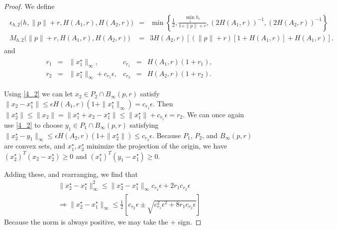\documentclass{article}
\theoremstyle{case}
\numberwithin{theorem}{subsection}
\newcommand{\bpr}{{B_{\infty}\left(p, r\right)}}
\begin{document}
\begin{proof}
We define
\begin{align*}
\begin{array}{rcl}
\epsilon_{h, 2}\big(h, \|p\| + r, H\left(A_1, r\right), H\left(A_2, r\right)\big) & = &
\min\left\{\frac 1 2, \frac{\min_i h_i}{1 + \|p\| + r},\left(2 H\left(A_1, r\right)\right)^{-1}, \left(2 H\left(A_2, r\right)\right)^{-1}\right\}\\
M_{h, 2} \big(\|p\| + r, H\left(A_1, r\right), H\left(A_2, r\right) \big) & = & 3H\left(A_2, r\right) \left[\left(\|p\| + r\right)\left[1 + H(A_1, r)\right] + H(A_1, r)\right].
\end{array}
\end{align*}
and
\begin{align*}
\begin{array}{rclrcl}
r_1 &=& \|x_1^{\star}\|_{\infty},
& c_{r_1} &=& H\left(A_1, r\right)\left(1 + r_1\right), \\
r_2 &=&  \|x_1^{\star}\|_{\infty} + c_{r_1}\epsilon,
& c_{r_2} &=&  H\left(A_2, r\right)\left(1 + r_2\right).
\end{array}
\end{align*}

Using \cref{4_2} we can let $x_2 \in P_2 \cap \bpr$ satisfy 
$\|x_2 - x_1^{\star}\| \le \epsilon H(A_1, r) \left(1 + \|x_1^{\star}\|_{\infty}\right) = c_{r_1}\epsilon$.
Then
$\|x_2^{\star}\| \le \|x_2\| = \|x_1^{\star} + x_2 - x_1^{\star}\| \le \|x_1^{\star}\| + c_{r_1}\epsilon = r_2$.
We can once again use \cref{4_2} to choose $y_1 \in P_1 \cap \bpr$ satisfying 
$\|x_2^{\star} - y_1\|_{\infty} \le \epsilon H(A_2, r)\left(1 + \|x_2^{\star}\|\right) \le c_{r_2}\epsilon$.
Because $P_1$, $P_2$, and $\bpr$ are convex sets, and $x_1^{\star}, x_2^{\star}$ minimize the projection of the origin, we have
$\left(x_2^{\star}\right)^T \left(x_2 - x_2^{\star}\right)\ge 0$ and
$\left(x_1^{\star}\right)^T \left(y_1 - x_1^{\star}\right)\ge 0$.

Adding these, and rearranging, we find that
\begin{align*}
\|x_2^{\star} - x_1^{\star}\|_{\infty}^2 \le \|x_2^{\star} - x_1^{\star}\|_{\infty} c_{r_2}\epsilon + 2r_1c_{r_2}\epsilon \\
\Longrightarrow \|x_2^{\star} - x_1^{\star}\|_{\infty} \le \frac 1 2 \left[c_{r_2}\epsilon \pm \sqrt{c_{r_1}^2\epsilon^2 + 8r_1c_{r_2}\epsilon}\right]
\end{align*}
Because the norm is always positive, we may take the $+$ sign.


\end{proof}
\end{document}
